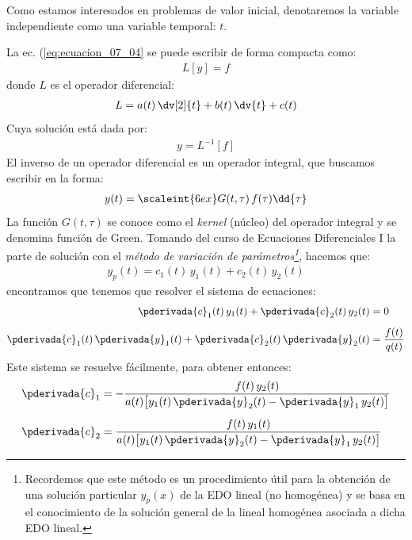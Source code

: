 Como estamos interesados en problemas de valor inicial, denotaremos la variable independiente como una variable temporal: $t$.
\par
La ec. (\ref{eq:ecuacion_07_04} se puede escribir de forma compacta como:
\begin{align*}
L [y] = f
\end{align*}
donde $L$ es el operador diferencial:
\begin{align*}
L = a (t) \, \dv[2]{t} + b (t) \, \dv{t} + c (t) 
\end{align*}
Cuya solución está dada por:
\begin{align*}
y = L^{-1} [f]
\end{align*}
El inverso de un operador diferencial es un operador integral, que buscamos escribir en la forma:
\begin{align*}
y (t) = \scaleint{6ex} G (t, \tau) \, f(\tau) \dd{\tau}
\end{align*}
La función $G (t, \tau)$ se conoce como el  \emph{kernel} (núcleo) del operador integral y  se denomina función de Green.
\newpage
Tomando del curso de Ecuaciones Diferenciales I la parte de solución con el \emph{método de variación de parámetros\footnote{Recordemos que este método es un procedimiento útil para la obtención de una solución particular
$y_{p} (x)$ de la EDO lineal (no homogénea) y se basa en el conocimiento de la solución general de la lineal homogénea asociada a dicha EDO lineal.}}, hacemos que:
\begin{align}
y_{p} (t) = c_{1} (t) \, y_{1} (t) + c_{2} (t) \, y_{2} (t)
\label{eq:ecuacion_07_05}
\end{align}
encontramos que tenemos que resolver el sistema de ecuaciones:
\begin{align}
\begin{aligned}[b]
\pderivada{c}_{1} (t) \, y_{1} (t) + \pderivada{c}_{2} (t) \, y_{2} (t) &= 0 \\[0.5em]
\pderivada{c}_{1} (t) \, \pderivada{y}_{1} (t) + \pderivada{c}_{2} (t) \, \pderivada{y}_{2} (t) &= \dfrac{f (t)}{q (t)}
\end{aligned}
\label{eq:ecuacion_07_06}
\end{align}
Este sistema se resuelve fácilmente, para obtener entonces:
\begin{align}
\begin{aligned}[b]
\pderivada{c}_{1} &= - \dfrac{f (t) \, y_{2} (t)}{a (t) \big[ y_{1} (t) \, \pderivada{y}_{2} (t)  - \pderivada{y}_{1} \, y_{2} (t) \big]} \\[0.5em]
\pderivada{c}_{2} &= \dfrac{f (t) \, y_{1} (t)}{a (t) \big[ y_{1} (t) \, \pderivada{y}_{2} (t)  - \pderivada{y}_{1} \, y_{2} (t) \big]}
\end{aligned}
\label{eq:ecuacion_07_07}
\end{align}
